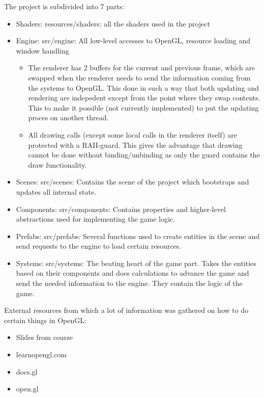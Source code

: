 \documentclass[]{article}
\begin{document}
The project is subdivided into 7 parts:
\begin{itemize}
      \item Shaders: resources/shaders: all the shaders used in the project
      \item Engine: src/engine: All low-level accesses to OpenGL, resource loading
            and window handling
            \begin{itemize}
                  \item The renderer has 2 buffers for the current and previous
                        frame, which are swapped when the renderer needs to send the
                        information coming from the systems to OpenGL. This done in
                        such a way that both updating and rendering are indepedent
                        except from the point where they swap contents. This to make
                        it possible (not currently implemented) to put the updating
                        proces on another thread.
                  \item All drawing calls (except some local calls in the renderer
                        itself) are protected with a RAII-guard. This gives the
                        advantage that drawing cannot be done without
                        binding/unbinding as only the guard contains the draw
                        functionality.
            \end{itemize}
      \item Scenes: src/scenes: Contains the scene of the project which bootstraps
            and updates all internal state.
      \item Components: src/components: Contains properties and higher-level
            abstractions used for implementing the game logic.
      \item Prefabs: src/prefabs: Several functions used to create entities in the
            scene and send requests to the engine to load certain resources.
      \item Systems: src/systems: The beating heart of the game part. Takes the
            entities based on their components and does calculations to advance
            the game and send the needed information to the engine. They contain
            the logic of the game.
\end{itemize}

External resources from which a lot of information was gathered on how to do
certain things in OpenGL:
\begin{itemize}
      \item Slides from course
      \item learnopengl.com
      \item docs.gl
      \item open.gl
\end{itemize}
\end{document}
